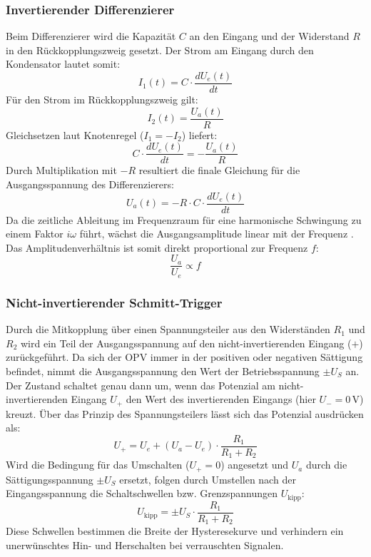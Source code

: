 \subsubsection{Invertierender Differenzierer}
\label{sec:differenzierer}
Beim Differenzierer wird die Kapazität $C$ an den Eingang und der Widerstand $R$ in den Rückkopplungszweig gesetzt. Der Strom am Eingang durch den Kondensator lautet somit:
\begin{equation*}
    I_1(t) = C \cdot \frac{d U_e(t)}{dt}
\end{equation*}
Für den Strom im Rückkopplungszweig gilt:
\begin{equation*}
    I_2(t) = \frac{U_a(t)}{R}
\end{equation*}
Gleichsetzen laut Knotenregel ($I_1 = -I_2$) liefert:
\begin{equation*}
    C \cdot \frac{d U_e(t)}{dt} = -\frac{U_a(t)}{R}
\end{equation*}
Durch Multiplikation mit $-R$ resultiert die finale Gleichung für die Ausgangsspannung des Differenzierers:
\begin{equation}
    U_a(t) = -R \cdot C \cdot \frac{d U_e(t)}{dt}
\end{equation}
Da die zeitliche Ableitung im Frequenzraum für eine harmonische Schwingung zu einem Faktor $i\omega$ führt, wächst die Ausgangsamplitude linear mit der Frequenz \cite{tietzeschenk}. Das Amplitudenverhältnis ist somit direkt proportional zur Frequenz $f$:
\begin{equation}
    \frac{U_a}{U_e} \propto f
\end{equation}

\subsubsection{Nicht-invertierender Schmitt-Trigger}
Durch die Mitkopplung über einen Spannungsteiler aus den Widerständen $R_1$ und $R_2$ wird ein Teil der Ausgangsspannung auf den nicht-invertierenden Eingang ($+$) zurückgeführt. Da sich der OPV immer in der positiven oder negativen Sättigung befindet, nimmt die Ausgangsspannung den Wert der Betriebsspannung $\pm U_S$ an. 
Der Zustand schaltet genau dann um, wenn das Potenzial am nicht-invertierenden Eingang $U_+$ den Wert des invertierenden Eingangs (hier $U_- = 0\,\text{V}$) kreuzt. Über das Prinzip des Spannungsteilers \cite{tietzeschenk} lässt sich das Potenzial ausdrücken als:
\begin{equation}
    U_+ = U_e + (U_a - U_e) \cdot \frac{R_1}{R_1 + R_2}
\end{equation}
Wird die Bedingung für das Umschalten ($U_+ = 0$) angesetzt und $U_a$ durch die Sättigungsspannung $\pm U_S$ ersetzt, folgen durch Umstellen nach der Eingangsspannung die Schaltschwellen bzw. Grenzspannungen $U_{\text{kipp}}$:
\begin{equation}
    \label{eqn:kipp}
    U_{\text{kipp}} = \pm U_S \cdot \frac{R_1}{R_1 + R_2}
\end{equation}
Diese Schwellen bestimmen die Breite der Hysteresekurve und verhindern ein unerwünschtes Hin- und Herschalten bei verrauschten Signalen.